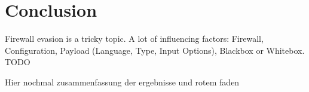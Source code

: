\section{Conclusion}
\label{sec:conclusion}
Firewall evasion is a tricky topic. A lot of influencing factors: Firewall, Configuration, Payload (Language, Type, Input Options), Blackbox or Whitebox. {\color{red}TODO}

Hier nochmal zusammenfassung der ergebnisse und rotem faden
